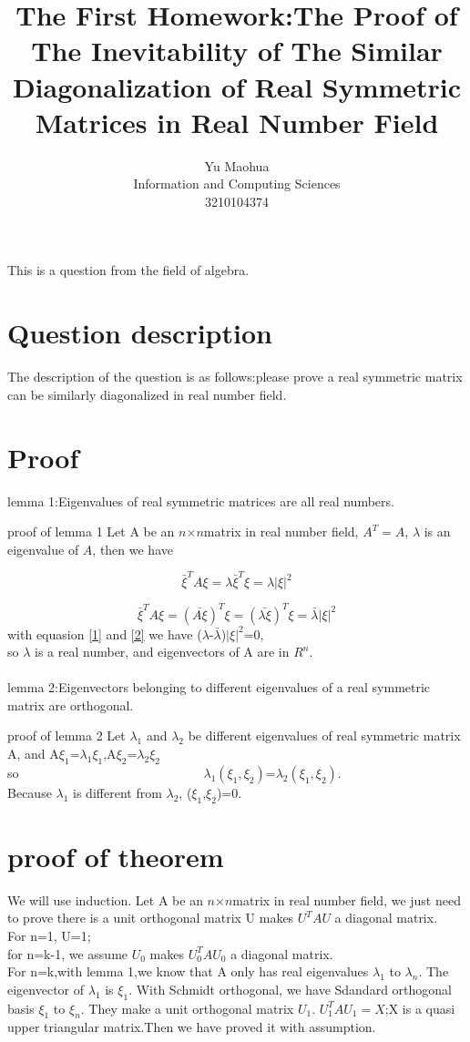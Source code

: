 \documentclass{article}
\title{The First Homework:The Proof of The Inevitability of The Similar Diagonalization of Real Symmetric Matrices in Real Number Field}
\author{Yu Maohua\\Information and Computing Sciences\\3210104374}
\begin{document}
\maketitle

This is a question from the field of algebra.

\section{Question description}

The description of the question is as follows:please prove a real symmetric matrix can be similarly diagonalized in real number field. 
\section{Proof}
lemma 1:Eigenvalues of real symmetric matrices are all real numbers.

proof of lemma 1 Let A be an $n$$\times n $matrix in real number field, $A^T=A$, $\lambda$ is an eigenvalue of $A$, then we have

\begin{equation}
\bar{\xi}^TA\xi = \lambda \bar{\xi}^T \xi =\lambda \left|\xi\right|^2	
\label{1}
\end{equation}

\begin{equation}
\bar{\xi}^TA\xi=(\bar{A\xi})^T\xi=(\bar{\lambda\xi})^T\xi=\bar{\lambda}\left|\xi\right|^2
\label{2}
\end{equation}
with equasion \ref{1} and \ref{2} we have ($\lambda$-$\bar{\lambda}$)$\left|\xi\right|^2$=0,\\
so $\lambda$ is a real number, and eigenvectors of A are in $R^n$.
\\
\\
lemma 2:Eigenvectors belonging to different eigenvalues of a real symmetric matrix are orthogonal.

proof of lemma 2 Let $\lambda_1$ and $\lambda_2$ be different eigenvalues of real symmetric matrix A, and A$\xi_1$=$\lambda_1$$\xi_1$,A$\xi_2$=$\lambda_2$$\xi_2$\\
so~~~~~~~~~~~~~~~~~~~~~~~~~~~~~$\lambda_1$$(\xi_1,\xi_2)$=$\lambda_2$$(\xi_1,\xi_2)$.\\
Because $\lambda_1$ is different from $\lambda_2$, ($\xi_1$,$\xi_2$)=0.\\
\section{proof of theorem}
We will use induction.
Let A be an $n$$\times$$n$matrix in real number field, we just need to prove there is a unit orthogonal matrix U makes $U^TAU$ a diagonal matrix.\\
For n=1, U={1};\\
for n=k-1, we assume $U_0$ makes $U_0^TAU_0$ a diagonal matrix.\\
For n=k,with lemma 1,we know that A only has real eigenvalues $\lambda_1$ to $\lambda_n$. The eigenvector of $\lambda_1$ is $\xi_1$. With Schmidt orthogonal, we have Sdandard orthogonal basis $\xi_1$ to $\xi_n$. They make a unit orthogonal matrix $U_1$. $U_1^TAU_1=X$;X is a quasi upper triangular matrix.Then we have proved it with assumption.
\end{document}
